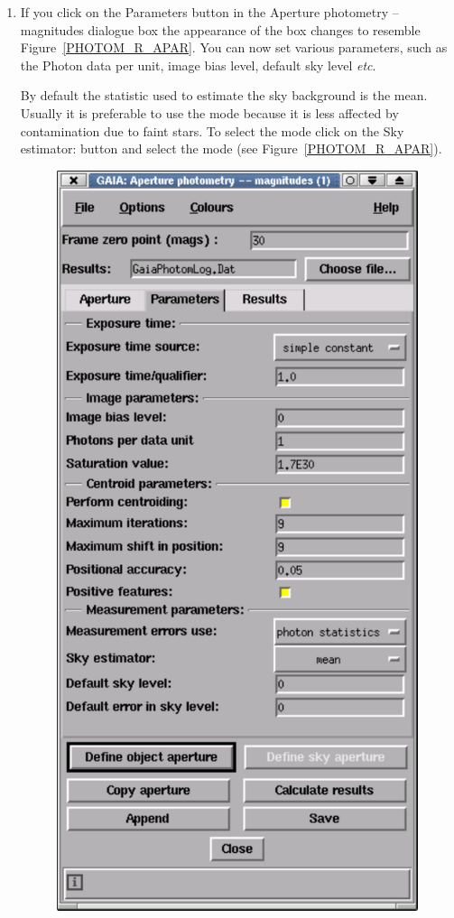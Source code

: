 \documentclass[twoside,11pt]{starlink}
\begin{document}
\begin{enumerate}
  \item If you click on the \textsf{Parameters} button in the \textsf{Aperture
   photometry -- magnitudes} dialogue box the appearance of the box
   changes to resemble Figure~\ref{PHOTOM_R_APAR}.  You can now set various
   parameters, such as the Photon data per unit, image bias level, default
   sky level \emph{etc}.

   By default the statistic used to estimate the sky background is
   the mean.  Usually it is preferable to use the mode because it is
   less affected by contamination due to faint stars.  To select the mode
   click on the \textsf{Sky estimator:} button and select the mode (see
   Figure~\ref{PHOTOM_R_APAR}).

  \begin{figure}[htbp]
     \centering
     \includegraphics[totalheight=5.5in]{sc17_photom_r_apar}

\end{figure}
\end{enumerate}
\end{document}
